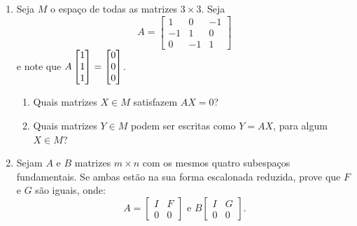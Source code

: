 \documentclass[leqno]{article}
\numberwithin{equation}{section}
\begin{document}
\begin{enumerate}
\item Seja $M$ o espaço de todas as matrizes $3 \times 3$. Seja
$$A = \begin{bmatrix}
1 & 0 & -1 \\
-1 & 1 & 0 \\
0 & -1 & 1
\end{bmatrix}$$
e note que $A \begin{bmatrix} 1 \\ 1 \\ 1 \end{bmatrix} = \begin{bmatrix} 0 \\ 0 \\ 0 \end{bmatrix}$.

\begin{enumerate}

\item Quais matrizes $X \in M$ satisfazem $AX = 0$?

	\begin{sol} 
	\end{sol} 
\item Quais matrizes $Y \in M$ podem ser escritas como $Y = AX$, para algum $X \in M$?

	\begin{sol} 
	\end{sol} 
\end{enumerate}

\item Sejam $A$ e $B$ matrizes $m \times n$ com os mesmos quatro subespaços fundamentais. Se ambas estão na sua forma escalonada reduzida, prove que $F$ e $G$ são iguais, onde:
$$A = \begin{bmatrix}
I & F \\
0 & 0
\end{bmatrix} \mbox{ e } B \begin{bmatrix}
I & G \\
0 & 0
\end{bmatrix}.$$

\begin{sol} 
\end{sol} 
\end{enumerate}
\end{document}
